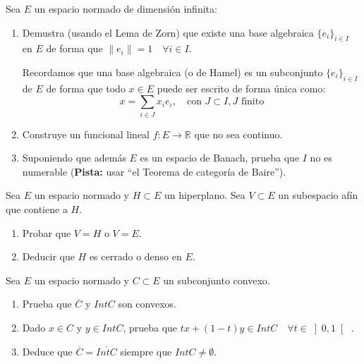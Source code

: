 \begin{ejercicio}
    Sea $E$ un espacio normado de dimensión infinita:
    \begin{enumerate}[label=\alph*)]
        \item Demustra (usando el Lema de Zorn) que existe una base algebraica $\{e_i\}_{i \in I}$ en $E$ de forma que $\|e_i\| = 1\quad \forall i \in I$.

            Recordamos que una base algebraica (o de Hamel) es un subconjunto $\{e_i\}_{i \in I}$ de $E$ de forma que todo $x\in E$ puede ser escrito de forma única como:
            \begin{equation*}
                x = \sum_{i \in J} x_i e_i, \quad \text{con\ } J\subset I, J \text{\ finito}
            \end{equation*}
        \item Construye un funcional lineal $f:E\to \mathbb{R}$ que no sea continuo.
        \item Suponiendo que además $E$ es un espacio de Banach, prueba que $I$ no es numerable (\textbf{Pista:} usar ``el Teorema de categoría de Baire'').
    \end{enumerate}
\end{ejercicio}

\begin{ejercicio}
    Sea $E$ un espacio normado y $H\subset E$ un hiperplano. Sea $V\subset E$ un subespacio afín que contiene a $H$.
    \begin{enumerate}[label=\alph*)]
        \item Probar que $V=H$ o $V=E$.
        \item Deducir que $H$ es cerrado o denso en $E$.
    \end{enumerate}
\end{ejercicio}

\begin{ejercicio}
    Sea $E$ un espacio normado y $C\subset E$ un subconjunto convexo.
    \begin{enumerate}[label=\alph*)]
        \item Prueba que $\overline{C}$ y $Int C$ son convexos.
        \item Dado $x\in C$ y $y\in Int C$, prueba que $tx+(1-t)y\in Int C\quad \forall t\in \left]0,1\right[$ .
        \item Deduce que $\overline{C} = \overline{Int C}$ siempre que $Int C\neq \emptyset $.
    \end{enumerate}
\end{ejercicio}

